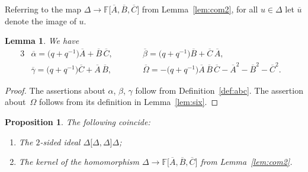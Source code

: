 \documentclass[pdftex]{sigma}
\numberwithin{equation}{section}
\newtheorem{Lemma}[Theorem]{Lemma}
\newtheorem{Proposition}[Theorem]{Proposition}
{\theoremstyle{definition}
\newtheorem{Note}[Theorem]{Note}
\newtheorem{Definition}[Theorem]{Definition}
\newtheorem{Problem}[Theorem]{Problem}
}
\begin{document}
\begin{Definition}
Referring to the map
$\Delta \to \mathbb F\lbrack
\overline A,
\overline B,
\overline C
\rbrack $
from Lemma~\ref{lem:com2}, for all
$u\in \Delta $ let $\overline u$ denote the image of
$u$.
\end{Definition}

\begin{Lemma}
\label{lem:com2a}
We have
\begin{alignat*}{3}
&\overline \alpha
=
\big(q+q^{-1}\big)\overline A
+
{\overline B}\, {\overline C},
\qquad &&
\overline \beta
=
\big(q+q^{-1}\big)\overline B
+
\overline C \,\overline A, &
\\
&
\overline \gamma
=
\big(q+q^{-1}\big)\overline C
+
\overline A \,\overline B,
\qquad &&  \overline \Omega =
-
\big(q+q^{-1}\big)\overline A \, \overline B \,\overline C
-
{\overline A}^2
-
{\overline B}^2
-
{\overline C}^2. &
\end{alignat*}
\end{Lemma}

\begin{proof}
The assertions about $\alpha$, $\beta$, $\gamma $
 follow from
Def\/inition~\ref{def:abc}.
The assertion about~$\Omega $ follows
from its def\/inition in
Lemma~\ref{lem:six}.
\end{proof}



\begin{Proposition}
\label{lem:coincide}
The following coincide:
\begin{enumerate}\itemsep=0pt
\item[$(i)$]
The $2$-sided ideal
$\Delta \lbrack  \Delta ,\Delta \rbrack \Delta $;
\item[$(ii)$]
The kernel of the homomorphism
$\Delta \to
\mathbb F\lbrack
\overline A,
\overline B,
\overline C
\rbrack $ from Lemma~{\rm \ref{lem:com2}}.
\end{enumerate}
\end{Proposition}
\end{document}
